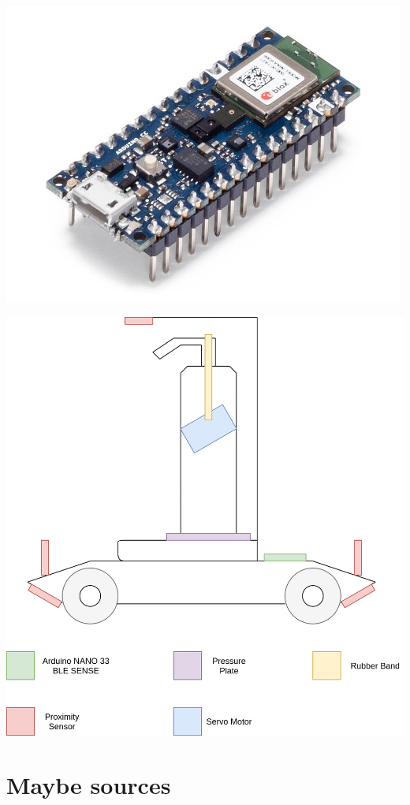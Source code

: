 \documentclass{article}
\begin{document}
\includegraphics[width=\linewidth]{img/abx00035_iso.jpg}

\includegraphics[width=\linewidth]{img/prototype-drawing.png}

\section{Maybe sources}
\end{document}
